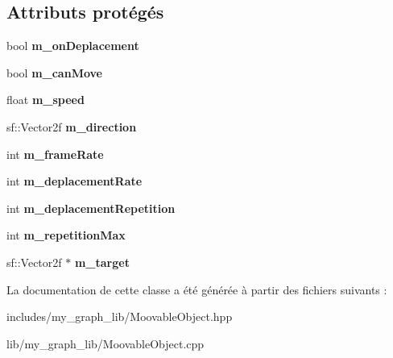\subsection*{Attributs protégés}
\begin{DoxyCompactItemize}
\item 
\mbox{\label{classmy_1_1MoovableObject_a56364bb6ed487aefb33b12ea4ce4ae4f}} 
bool {\bfseries m\+\_\+on\+Deplacement}
\item 
\mbox{\label{classmy_1_1MoovableObject_aa8457f2cbc937965ddd9c577560ea75c}} 
bool {\bfseries m\+\_\+can\+Move}
\item 
\mbox{\label{classmy_1_1MoovableObject_a290ccefafadf9a0ca24db7a0a91bdc46}} 
float {\bfseries m\+\_\+speed}
\item 
\mbox{\label{classmy_1_1MoovableObject_a93dfa01e2a5b853bd28edfd2b5f72b5f}} 
sf\+::\+Vector2f {\bfseries m\+\_\+direction}
\item 
\mbox{\label{classmy_1_1MoovableObject_a9ef9e4b79fae2447d36518155f6b8e54}} 
int {\bfseries m\+\_\+frame\+Rate}
\item 
\mbox{\label{classmy_1_1MoovableObject_a4a02ffbb4f66d72f39f2106281e4f3a7}} 
int {\bfseries m\+\_\+deplacement\+Rate}
\item 
\mbox{\label{classmy_1_1MoovableObject_a5f5ead094141e29bf7f0251a0b780059}} 
int {\bfseries m\+\_\+deplacement\+Repetition}
\item 
\mbox{\label{classmy_1_1MoovableObject_a264d9d3a9c16fd1435c6b48bca23b7a8}} 
int {\bfseries m\+\_\+repetition\+Max}
\item 
\mbox{\label{classmy_1_1MoovableObject_a6402bb1ad6cfa59483d9eb70f4ad1aab}} 
sf\+::\+Vector2f $\ast$ {\bfseries m\+\_\+target}
\end{DoxyCompactItemize}


La documentation de cette classe a été générée à partir des fichiers suivants \+:\begin{DoxyCompactItemize}
\item 
includes/my\+\_\+graph\+\_\+lib/Moovable\+Object.\+hpp\item 
lib/my\+\_\+graph\+\_\+lib/Moovable\+Object.\+cpp\end{DoxyCompactItemize}

